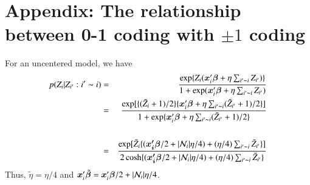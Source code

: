 \documentclass[authoryear,review, 12pt]{elsarticle}
\begin{document}
\section*{Appendix: The relationship between 0-1 coding with  $\pm 1$ coding}

For an uncentered model, we have
      \begin{eqnarray*}
 p(Z_i|Z_{i'}: i'\thicksim i)&=&\frac{\exp\{ {Z_i(\bm{x}_i'\bm{\beta}+\eta\sum_{i'\thicksim i}Z_{i'}}) \} }{1+\exp(\bm{x}_i'\bm{\beta}+\eta\sum_{i'\thicksim i}Z_{i'})}
\\
&=& \frac{\exp [ { \{(\tilde{Z}_i+1)/2 \} \{\bm{x}_i'\bm{\beta}+\eta\sum_{i'\thicksim i}(\tilde{Z}_{i'}+1)/2} \}] }{1+\exp\{ \bm{x}_i'\bm{\beta}+\eta\sum_{i'\thicksim i}(\tilde{Z}_{i'}+1)/2\}}
\\
\\
&=&\frac{\exp[\tilde{Z}_i \{(\bm{x_i'}{\bm\beta}/2+|{\cal N}_i|\eta/4)+(\eta/4 )\sum_{i'\thicksim i}\tilde{Z}_{i'}\}]}  {2\cosh\{(\bm{x_i'}{\bm\beta}/2+|{\cal N}_i|\eta/4)+(\eta/4 )\sum_{i'\thicksim i}\tilde{Z}_{i'}\}}
\end{eqnarray*}
Thus, $\tilde{\eta}=\eta/4$ and $\bm{x}_i'\tilde{\bm{\beta}}=\bm{x}_i'\bm{\beta}/2+|{\cal N}_i|\eta/4$.
\end{document}
